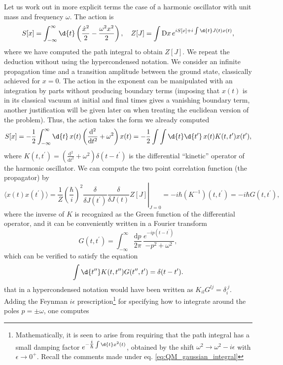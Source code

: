 Let us work out in more explicit terms the case of a harmonic oscillator with unit mass and frequency \(\omega\). The action is
\[
    S[x] = \int_{-\infty}^{\infty} \d{t} \left(\frac{\dot{x}^2}{2} - \frac{\omega^2 x^2}{2}\right), \quad Z[J] = \int \mathrm{D} x \, e^{i S[x] + i \int \d{t} J(t) x(t)},
\]
where we have computed the path integral to obtain \(Z[J]\). We repeat the deduction without using the hypercondensed notation. We consider an infinite propagation time and a transition amplitude between the ground state, classically achieved for \(x=0\). The action in the exponent can be manipulated with an integration by parts without producing boundary terms (imposing that \(x(t)\) is in its classical vacuum at initial and final times gives a vanishing boundary term, another justification will be given later on when treating the euclidean version of the problem). Thus, the action takes the form we already computed
\[
    S[x] = -\frac{1}{2} \int_{-\infty}^{\infty} \d{t} \, x(t) \left(\frac{\mathrm{d}^2}{\mathrm{d} t^2} + \omega^2 \right) x(t) = -\frac{1}{2}\int \int \d{t} \d{t^{\prime}} \, x(t) K(t, t^{\prime}) x(t^{\prime}),
\]
where \(K(t, t^{\prime}) = \left(\frac{\mathrm{d}^2}{\mathrm{d} t^2} + \omega^2 \right) \delta(t - t^{\prime})\) is the differential “kinetic” operator of the harmonic oscillator. We can compute the two point correlation function (the propagator) by
\[
    \langle x(t) x(t^{\prime}) \rangle = \left. \frac{1}{Z} \left(\frac{\hbar}{i}\right)^2 \frac{\delta}{\delta J(t^{\prime})} \frac{\delta}{\delta J(t)} Z[J] \right|_{J=0} = -i\hbar (K^{-1})(t, t^{\prime}) = -i \hbar G(t, t^{\prime}),
\]
where the inverse of \(K\) is recognized as the Green function of the differential operator, and it can be conveniently written in a Fourier transform
\[
    G(t,t^{\prime}) = \int_{-\infty}^{\infty} \frac{\mathrm{d}p}{2\pi} \, \frac{e^{-ip(t-t^{\prime})}}{-p^2 +\omega^2},
\]
which can be verified to satisfy the equation
\[
    \int \d{t^{\prime \prime}} K(t, t^{\prime \prime}) G(t^{\prime \prime}, t^{\prime}) = \delta(t - t^{\prime}).
\]
that in a hypercondensed notation would have been written as \(K_{il} G^{lj} = \delta_i^{\ j}\). Adding the Feynman \(i\epsilon\) prescription\footnote{Mathematically, it is seen to arise from requiring that the path integral has a small damping factor \(e^{-\tfrac{i}{\hbar} \int \d{t} x^2(t)}\), obtained by the shift \(\omega^2 \to \omega^2 - i \epsilon\) with \(\epsilon \to 0^+\). Recall the comments made under eq. \eqref{eq:QM_gaussian_integral}} for specifying how to integrate around the poles \(p=\pm \omega\), one computes

